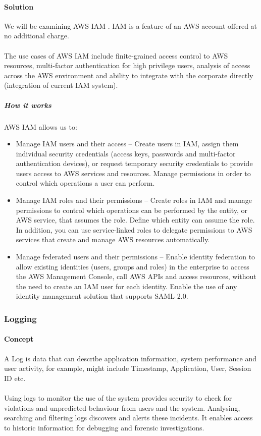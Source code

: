 \documentclass[10pt]{article}
\begin{document}
\paragraph{Solution}
We will be examining AWS IAM \cite{aws-iam}. IAM is a feature of an AWS account offered at no additional charge. 
\\ \\
The use cases of AWS IAM include finite-grained access control to AWS resources, multi-factor authentication for high privilege users, analysis of access across the AWS environment and ability to integrate with the corporate directly (integration of current IAM system). 
\subparagraph{How it works}
AWS IAM allows us to:
\begin{itemize}
    \item Manage IAM users and their access –  Create users in IAM, assign them individual security credentials (access keys, passwords and multi-factor authentication devices), or request temporary security credentials to provide users access to AWS services and resources. Manage permissions in order to control which operations a user can perform.
    \item Manage IAM roles and their permissions – Create roles in IAM and manage permissions to control which operations can be performed by the entity, or AWS service, that assumes the role. Define which entity can assume the role. In addition, you can use service-linked roles to delegate permissions to AWS services that create and manage AWS resources automatically.
    \item Manage federated users and their permissions – Enable identity federation to allow existing identities (users, groups and roles) in the enterprise to access the AWS Management Console, call AWS APIs and access resources, without the need to create an IAM user for each identity. Enable the use of any identity management solution that supports SAML 2.0.
\end{itemize}

\subsubsection{Logging}
\paragraph{Concept}
A Log is data that can describe application information, system performance and user activity, for example, might include Timestamp, Application, User, Session ID etc.
\\ \\
Using logs to monitor the use of the system provides security to check for violations and unpredicted behaviour from users and the system. Analysing, searching and filtering logs discovers and alerts these incidents. It enables access to historic information for debugging and forensic investigations. \cite{logs}
\end{document}
